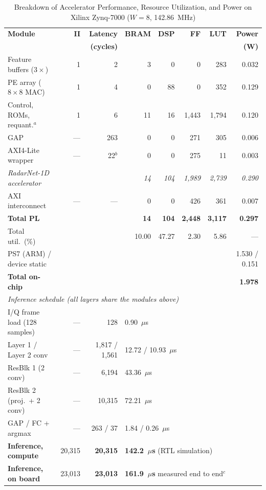 \documentclass[conference]{IEEEtran}
\begin{document}
\begin{table}[t]
\renewcommand{\arraystretch}{1.15}
\caption{Breakdown of Accelerator Performance, Resource Utilization, and Power on Xilinx Zynq-7000 ($W{=}8$, 142.86~MHz)}
\label{tab:power}
\centering
\footnotesize
\setlength{\tabcolsep}{5pt}
\begin{tabular}{lrrrrrrr}
\toprule
\textbf{Module} & \textbf{II} & \textbf{Latency} & \textbf{BRAM} & \textbf{DSP} & \textbf{FF} & \textbf{LUT} & \textbf{Power} \\
 & & \textbf{(cycles)} & & & & & \textbf{(W)} \\
\midrule
Feature buffers ($3\times$) & 1 & 2 & 3 & 0 & 0 & 283 & 0.032 \\
PE array ($8\times8$ MAC) & 1 & 4 & 0 & 88 & 0 & 352 & 0.129 \\
Control, ROMs, requant.$^{a}$ & 1 & 6 & 11 & 16 & 1,443 & 1,794 & 0.120 \\
GAP & --- & 263 & 0 & 0 & 271 & 305 & 0.006 \\
AXI4-Lite wrapper & --- & 22$^{b}$ & 0 & 0 & 275 & 11 & 0.003 \\
\textit{RadarNet-1D accelerator} & & & \textit{14} & \textit{104} & \textit{1,989} & \textit{2,739} & \textit{0.290} \\
AXI interconnect & --- & --- & 0 & 0 & 426 & 361 & 0.007 \\
\midrule
\textbf{Total PL} & & & \textbf{14} & \textbf{104} & \textbf{2,448} & \textbf{3,117} & \textbf{0.297} \\
Total util.\ (\%) & & & 10.00 & 47.27 & 2.30 & 5.86 & --- \\
PS7 (ARM) / device static & & & & & & & 1.530 / 0.151 \\
\textbf{Total on-chip} & & & & & & & \textbf{1.978} \\
\midrule[\heavyrulewidth]
\multicolumn{8}{l}{\textit{Inference schedule (all layers share the modules above)}} \\
I/Q frame load (128 samples) & --- & 128 & \multicolumn{5}{l}{0.90~$\mu$s} \\
Layer 1 / Layer 2 conv & --- & 1,817 / 1,561 & \multicolumn{5}{l}{12.72 / 10.93~$\mu$s} \\
ResBlk 1 (2 conv) & --- & 6,194 & \multicolumn{5}{l}{43.36~$\mu$s} \\
ResBlk 2 (proj.\ + 2 conv) & --- & 10,315 & \multicolumn{5}{l}{72.21~$\mu$s} \\
GAP / FC + argmax & --- & 263 / 37 & \multicolumn{5}{l}{1.84 / 0.26~$\mu$s} \\
\midrule
\textbf{Inference, compute} & 20,315 & \textbf{20,315} & \multicolumn{5}{l}{\textbf{142.2~$\mu$s} (RTL simulation)} \\
\textbf{Inference, on board} & 23,013 & \textbf{23,013} & \multicolumn{5}{l}{\textbf{161.9~$\mu$s} measured end to end$^{c}$} \\
\bottomrule
\end{tabular}


\end{table}
\end{document}

